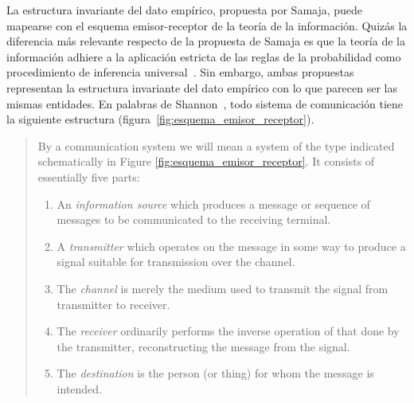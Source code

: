 \documentclass[a4paper,11pt]{book}
\theoremstyle{definition}
\begin{document}

La estructura invariante del dato emp\'irico, propuesta por Samaja, puede mapearse con el esquema emisor-receptor de la teor\'ia de la informaci\'on.
%
Quiz\'as la diferencia m\'as relevante respecto de la propuesta de Samaja es que la teor\'ia de la informaci\'on adhiere a la aplicaci\'on estricta de las reglas de la probabilidad como procedimiento de inferencia universal~\cite{Mackay2003}.
%
Sin embargo, ambas propuestas representan la estructura invariante del dato emp\'irico con lo que parecen ser las mismas entidades.
%
En palabras de Shannon~\cite{shannon1948-theoryOfCommunication}, todo sistema de comunicaci\'on tiene la siguiente estructura (figura~\ref{fig:esquema_emisor_receptor}).
%
\begin{quotation}
By a communication system we will mean a system of the type indicated schematically in Figure \ref{fig:esquema_emisor_receptor}. It consists of essentially five parts:
 \begin{enumerate} \setlength\itemsep{-0.05cm}
  \item An \emph{information source} which produces a message or sequence of messages to be communicated to the receiving terminal.
  \item A \emph{transmitter} which operates on the message in some way to produce a signal suitable for transmission over the channel.
  \item The \emph{channel} is merely the medium used to transmit the signal from transmitter to receiver.
  \item The \emph{receiver} ordinarily performs the inverse operation of that done by the transmitter, reconstructing the message from the signal.
  \item The \emph{destination} is the person (or thing) for whom the message is intended.
 \end{enumerate}
\end{quotation}
%
\end{document}
